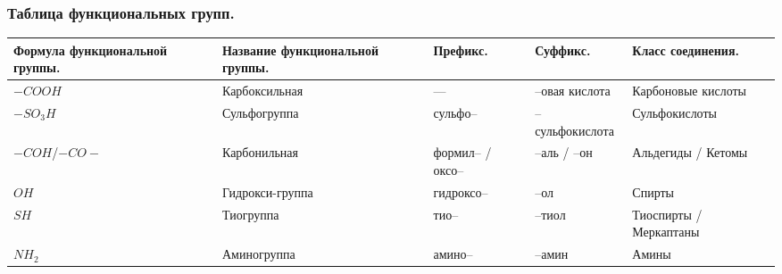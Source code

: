 \documentclass[12pt]{article}
\begin{document}
	\subsubsection{Таблица функциональных групп.}
	\begin{xltabular}{\textwidth}{|X|X|X|X|X|}
		\hline
		Формула функциональной группы. & Название функциональной группы. & Префикс. & Суффикс. & Класс соединения. \\
		\hline
		$-COOH$ & Карбоксильная & --- & --овая кислота & Карбоновые кислоты \\
		\hline
		$-SO_3H$ & Сульфогруппа & сульфо-- & --сульфокислота & Сульфокислоты \\
		\hline
		$-COH$/$-CO-$ & Карбонильная & формил-- / оксо-- & --аль / --он & Альдегиды / Кетомы \\
		\hline
		$OH$ & Гидрокси-группа & гидроксо-- & --ол & Спирты \\
		\hline
		$SH$ & Тиогруппа & тио-- & --тиол & Тиоспирты / Меркаптаны \\
		\hline
		$NH_2$ & Аминогруппа & амино-- & --амин & Амины \\
		\hline
	\end{xltabular}
\end{document}

